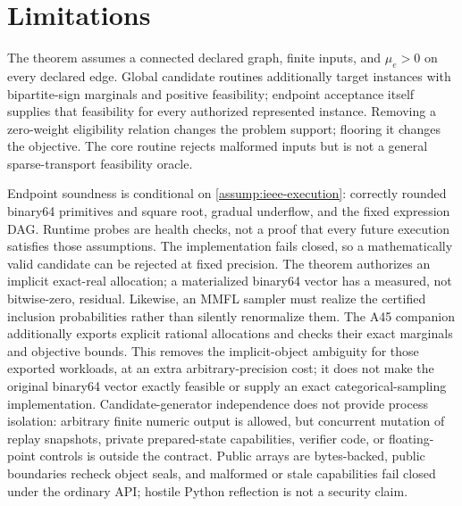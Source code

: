 \documentclass[smallextended,envcountsect]{svjour3}
\begin{document}
\section{Limitations}
\label{sec:limitations}

The theorem assumes a connected declared graph, finite inputs, and $\mu_e>0$ on
every declared edge.  Global candidate routines additionally target instances
with bipartite-sign marginals and positive feasibility; endpoint acceptance
itself supplies that feasibility for every authorized represented instance.
Removing a zero-weight eligibility relation changes the problem support;
flooring it changes the objective.  The core routine rejects malformed inputs
but is not a general sparse-transport feasibility oracle.

Endpoint soundness is conditional on
\cref{assump:ieee-execution}: correctly rounded binary64 primitives and square
root, gradual underflow, and the fixed expression DAG.  Runtime probes are
health checks, not a proof that every future execution satisfies those
assumptions.  The implementation fails closed, so a mathematically valid
candidate can be rejected at fixed precision.  The theorem authorizes an
implicit exact-real allocation; a materialized binary64 vector has a measured,
not bitwise-zero, residual.  Likewise, an MMFL sampler must realize the certified
inclusion probabilities rather than silently renormalize them.
The A45 companion additionally exports explicit rational allocations and checks
their exact marginals and objective bounds. This removes the implicit-object
ambiguity for those exported workloads, at an extra arbitrary-precision cost;
it does not make the original binary64 vector exactly feasible or supply an
exact categorical-sampling implementation.
Candidate-generator independence does not provide process isolation: arbitrary
finite numeric output is allowed, but concurrent mutation of replay snapshots,
private prepared-state capabilities, verifier code, or floating-point controls
is outside the contract.  Public arrays are bytes-backed, public boundaries
recheck object seals, and malformed or stale capabilities fail closed under the
ordinary API; hostile Python reflection is not a security claim.
\end{document}
